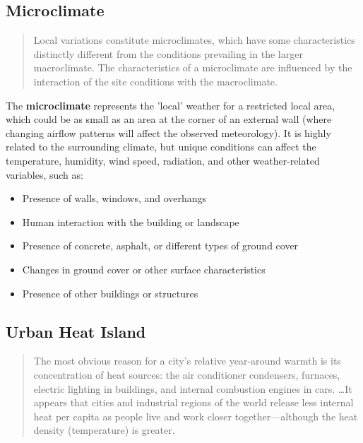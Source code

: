 \documentclass[10pt]{article}
\begin{document}
\subsection{Microclimate}

\begin{quote}
    Local variations constitute microclimates, which have some characteristics distinctly different from the conditions prevailing in the larger macroclimate. The characteristics of a microclimate are influenced by the interaction of the site conditions with the macroclimate. \cite{Grondzik2014-gt}
\end{quote}

The \textbf{microclimate} represents the 'local' weather for a restricted local area, which could be as small as an area at the corner of an external wall (where changing airflow patterns will affect the observed meteorology). It is highly related to the surrounding climate, but unique conditions can affect the temperature, humidity, wind speed, radiation, and other weather-related variables, such as:

\begin{itemize}
    \setlength{\itemsep}{0pt}%
    \setlength{\parskip}{0pt}%
    \item Presence of walls, windows, and overhangs
    \item Human interaction with the building or landscape
    \item Presence of concrete, asphalt, or different types of ground cover
    \item Changes in ground cover or other surface characteristics
    \item Presence of other buildings or structures
\end{itemize}

\subsection{Urban Heat Island}

\begin{quote}
    The most obvious reason for a city's relative year-around warmth is its concentration of heat sources: the air conditioner condensers, furnaces, electric lighting in buildings, and internal combustion engines in cars. \ldots It appears that cities and industrial regions of the world release less internal heat per capita as people live and work closer together---although the heat density (temperature) is greater. \cite{Grondzik2014-gt}
\end{quote}
\end{document}
